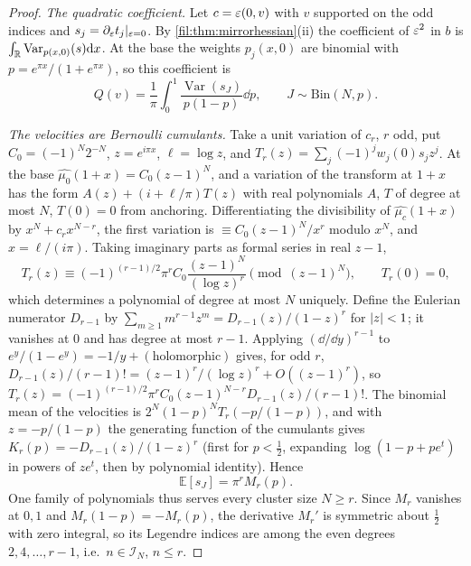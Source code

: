 \begin{proof}
\emph{The quadratic coefficient.} Let $c=\varepsilon(0,v)$ with $v$ supported on the odd indices and
$s_j=\partial_\varepsilon t_j\vert_{\varepsilon=0}$. By \cref{fil:thm:mirrorhessian}\textup{(ii)} the coefficient of $\varepsilon^2$ in $b$ is
$\int_{\mathbb{R}}\operatorname{Var}_{p(x,0)}(s)\mathrm{d} x$. At the base the weights $p_j(x,0)$ are binomial with
$p=e^{\pi x}/(1+e^{\pi x})$, so this coefficient is
\begin{equation}\label{fil:eq:variance}
 Q(v)=\frac1\pi\int_0^1\frac{\operatorname{Var}(s_J)}{p(1-p)}\dd p,\qquad J\sim\mathrm{Bin}(N,p).
\end{equation}

\emph{The velocities are Bernoulli cumulants.} Take a unit variation of $c_r$, $r$ odd, put
$C_0=(-1)^N2^{-N}$, $z=e^{i\pi x}$, $\ell=\log z$, and $T_r(z)=\sum_j(-1)^jw_j(0)s_jz^j$. At the base
$\widehat{\mu_0}(1+x)=C_0(z-1)^N$, and a variation of the transform at $1+x$ has the form $A(z)+(i+\ell/\pi)T(z)$
with real polynomials $A$, $T$ of degree at most $N$, $T(0)=0$ from anchoring. Differentiating the
divisibility of $\widehat{\mu_c}(1+x)$ by $x^N+c_rx^{N-r}$, the first variation is $\equiv C_0(z-1)^N/x^r$ modulo $x^N$, and
$x=\ell/(i\pi)$. Taking imaginary parts as formal series in real $z-1$,
\[
 T_r(z)\equiv(-1)^{(r-1)/2}\pi^rC_0\frac{(z-1)^N}{(\log z)^r}\pmod{(z-1)^N},\qquad T_r(0)=0,
\]
which determines a polynomial of degree at most $N$ uniquely. Define the Eulerian numerator $D_{r-1}$ by
$\sum_{m\ge1}m^{r-1}z^m=D_{r-1}(z)/(1-z)^r$ for $\lvert z\rvert<1$; it vanishes at $0$ and has degree at most $r-1$. Applying
$(\dd/\dd y)^{r-1}$ to $e^y/(1-e^y)=-1/y+(\text{holomorphic})$ gives, for odd $r$,
$D_{r-1}(z)/(r-1)!=(z-1)^r/(\log z)^r+O((z-1)^r)$, so
$T_r(z)=(-1)^{(r-1)/2}\pi^rC_0(z-1)^{N-r}D_{r-1}(z)/(r-1)!$. The binomial mean of the velocities is
$2^N(1-p)^NT_r(-p/(1-p))$, and with $z=-p/(1-p)$ the generating function of the cumulants gives
$K_r(p)=-D_{r-1}(z)/(1-z)^r$ (first for $p<\tfrac12$, expanding $\log(1-p+pe^t)$ in powers of $ze^t$, then by polynomial
identity). Hence
\begin{equation}\label{fil:eq:means}
 \mathbb E[s_J]=\pi^rM_r(p).
\end{equation}
One family of polynomials thus serves every cluster size $N\ge r$. Since $M_r$ vanishes at $0,1$ and
$M_r(1-p)=-M_r(p)$, the derivative $M_r'$ is symmetric about $\tfrac12$ with zero integral, so its Legendre
indices are among the even degrees $2,4,\dots,r-1$, i.e.\ $n\in\mathcal I_N$, $n\le r$.


\end{proof}

